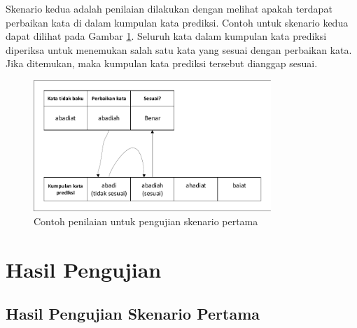 Skenario kedua adalah penilaian dilakukan dengan melihat apakah terdapat perbaikan kata di dalam kumpulan kata prediksi. Contoh untuk skenario kedua dapat dilihat pada Gambar \ref{fig:skenario2_eg}. Seluruh kata dalam kumpulan kata prediksi diperiksa untuk menemukan salah satu kata yang sesuai dengan perbaikan kata. Jika ditemukan, maka kumpulan kata prediksi tersebut dianggap sesuai.
\begin{figure}[ht]
	\centering
	\includegraphics[width=0.8\textwidth, trim=2 2 2 2, clip]{resources/4/skenario2_eg.pdf}
	\caption{Contoh penilaian untuk pengujian skenario pertama}
	\label{fig:skenario2_eg}
\end{figure}

\section{Hasil Pengujian}

\subsection{Hasil Pengujian Skenario Pertama}

